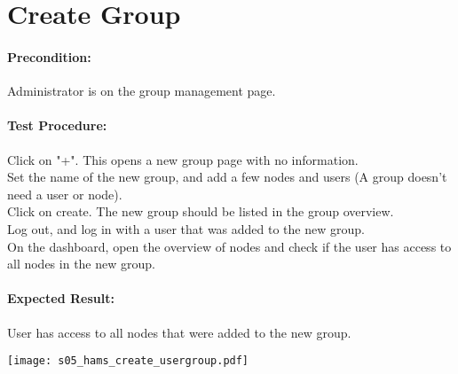 \documentclass{scrreprt}
\begin{document}
\begin{minipage}[c]{0.4\textwidth}
\section{Create Group}

\paragraph{Precondition:}
Administrator is on the group management page.

\paragraph{Test Procedure:}
Click on "+". This opens a new group page with no information.\\
Set the name of the new group, and add a few nodes and users (A group
doesn't need a user or node). \\
Click on create. The new group should be listed in the group overview.\\
Log out, and log in with a user that was added to the new group.\\
On the dashboard, open the overview of nodes and check if the user has access to all nodes in the new group.\\

\paragraph{Expected Result:}
User has access to all nodes that were added to the new group.

\end{minipage}
\hfill
\begin{minipage}[c]{0.5\textwidth}
	\texttt{[image: s05\_hams\_create\_usergroup.pdf]}
\end{minipage}
\end{document}
